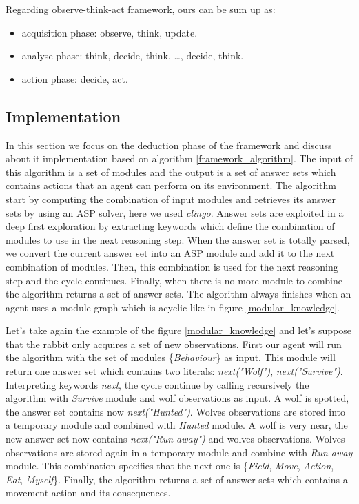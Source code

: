 \documentclass{aamas2012}
\begin{document}
	Regarding observe-think-act framework, ours can be sum up as:
	\begin{itemize}
		\item acquisition phase: observe, think, update.
		\item analyse phase: think, decide, think, \ldots, decide, think.
		\item action phase: decide, act.
	\end{itemize}
	
\subsection{Implementation}

	In this section we focus on the deduction phase of the framework and discuss about it implementation based on algorithm \ref{framework_algorithm}.
	The input of this algorithm is a set of modules and the output is a set of answer sets which contains actions that an agent can perform on its environment.
	The algorithm start by computing the combination of input modules and retrieves its answer sets by using an ASP solver, here we used \emph{clingo}.
	Answer sets are exploited in a deep first exploration by extracting keywords which define the combination of modules to use in the next reasoning step.
	When the answer set is totally parsed, we convert the current answer set into an ASP module and add it to the next combination of modules.
	Then, this combination is used for the next reasoning step and the cycle continues.
	Finally, when there is no more module to combine the algorithm returns a set of answer sets.
	The algorithm always finishes when an agent uses a module graph which is acyclic like in figure \ref{modular_knowledge}.

	Let's take again the example of the figure \ref{modular_knowledge} and let's suppose that the rabbit only acquires a set of new observations.
	First our agent will run the algorithm with the set of modules \{\emph{Behaviour}\} as input.
	This module will return one answer set which contains two literals: \emph{next("Wolf")}, \emph{next("Survive")}.
	Interpreting keywords \emph{next}, the cycle continue by calling recursively the algorithm with \emph{Survive} module and wolf observations as input.
	A wolf is spotted, the answer set contains now \emph{next("Hunted")}.
	Wolves observations are stored into a temporary module and combined with \emph{Hunted} module.
	A wolf is very near, the new answer set now contains \emph{next("Run away")} and wolves observations.
	Wolves observations are stored again in a temporary module and combine with \emph{Run away} module.
	This combination specifies that the next one is \{\emph{Field}, \emph{Move}, \emph{Action}, \emph{Eat}, \emph{Myself}\}.
	Finally, the algorithm returns a set of answer sets which contains a movement action and its consequences.
	
\end{document}
